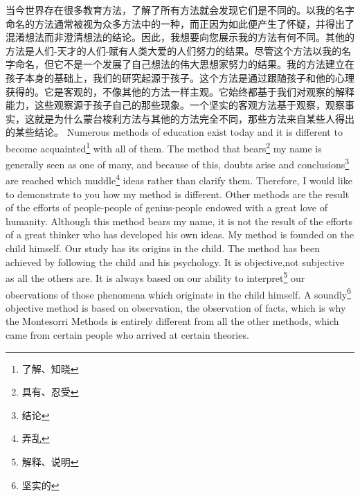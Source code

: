 \documentclass[lang=cn,10pt]{elegantbook}
\begin{document}
\begin{tcolorbox}[title=译文,
colback=red!5!white,
colframe=red!75!black,
fonttitle=\bfseries]
当今世界存在很多教育方法，了解了所有方法就会发现它们是不同的。以我的名字命名的方法通常被视为众多方法中的一种，而正因为如此便产生了怀疑，并得出了混淆想法而非澄清想法的结论。因此，我想要向您展示我的方法有何不同。其他的方法是人们-天才的人们-赋有人类大爱的人们努力的结果。尽管这个方法以我的名字命名，但它不是一个发展了自己想法的伟大思想家努力的结果。我的方法建立在孩子本身的基础上，我们的研究起源于孩子。这个方法是通过跟随孩子和他的心理获得的。它是客观的，不像其他的方法一样主观。它始终都基于我们对观察的解释能力，这些观察源于孩子自己的那些现象。一个坚实的客观方法基于观察，观察事实，这就是为什么蒙台梭利方法与其他的方法完全不同，那些方法来自某些人得出的某些结论。
Numerous methods of education exist today and it is different to become acquainted\footnote{了解、知晓} with all of them. The method that bears\footnote{具有、忍受} my name is generally seen as one of many, and because of this, doubts arise and conclusions\footnote{结论} are reached which muddle\footnote{弄乱} ideas rather than clarify them. Therefore, I would like to demonstrate to you how my method is different. Other methods are the result of the efforts of people-people of genius-people endowed with a great love of humanity. Although this method bears my name, it is not the result of the efforts of a great thinker who has developed his own ideas. My method is founded on the child himself. Our study has its origins in the child. The method has been achieved by following the child and his psychology. It is objective,not subjective as all the others are. It is always based on our ability to interpret\footnote{解释、说明} our observations of those phenomena which originate in the child himself. A soundly\footnote{坚实的} objective method is based on observation, the observation of facts, which is why the Montesorri Methods is entirely different from all the other methods, which came from certain people who arrived at certain theories.
\end{tcolorbox}
\end{document}

